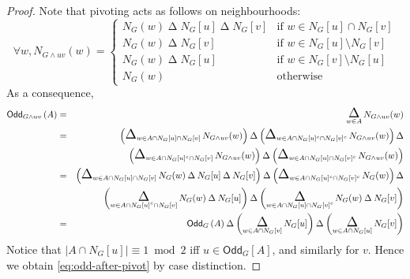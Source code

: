 \documentclass[a4paper,onecolumn,superscriptaddress,11pt,accepted=2020-04-27]{quantumarticle}
\newcommand{\symd}{\mathbin{\Delta}\xspace}
\newcommand{\Symdi}[1]{\underset{\scriptstyle #1}{\scalebox{1.5}{$\symd$}}\,}
\newcommand{\symdi}[1]{{\scalebox{1.5}{$\symd$}}_{#1}\,}
\newcommand{\odd}[2]{\textsf{Odd}_{#1}\left(#2\right)}
\newcommand{\codd}[2]{\textsf{Odd}_{#1}\left[#2\right]}
\theoremstyle{definition}
\begin{document}
\begin{proof}

Note that pivoting acts as follows on neighbourhoods: %
$$\forall w, N_{G\wedge uv} (w) = \begin{cases} 
N_G(w) \symd N_G[u]\symd N_G[v] &\text{if $w\in N_G[u]\cap N_G[v]$}\\
N_G(w) \symd N_G[v] &\text{if $w\in N_G[u]\setminus  N_G[v]$}\\
N_G(w) \symd N_G[u] &\text{if $w\in N_G[v]\setminus  N_G[u]$}\\
 N_G(w) &\text{otherwise} \end{cases}$$
As a consequence, %
\begin{eqnarray*}
  \odd {G\wedge uv} A&=&\Symdi{w\in A} N_{G\wedge uv} (w)\\
  &=& \left(\symdi{w\in A\cap N_G[u]\cap N_G[v]} N_{G\wedge uv} (w) \right) \symd
      \left(\symdi{w\in A\cap N_G[u]^c\cap N_G[v]^c} N_{G\wedge uv} (w) \right) \symd \\
&&    \left(\symdi{w\in A\cap N_G[u]^c\cap N_G[v]} N_{G\wedge uv} (w) \right) \symd
      \left(\symdi{w\in A\cap N_G[u]\cap N_G[v]^c} N_{G\wedge uv} (w) \right) \\
 &=& \left(\symdi{w\in A\cap N_G[u]\cap N_G[v]} N_{G} (w) \symd N_G[u]\symd N_G[v] \right) \symd
    \left(\symdi{w\in A\cap N_G[u]^c\cap N_G[v]^c} N_{G} (w) \right) \symd \\
&&    \left(\Symdi{w\in A\cap N_G[u]^c\cap N_G[v]} N_{G} (w)  \symd N_G[u] \right) \symd
      \left(\Symdi{w\in A\cap N_G[u]\cap N_G[v]^c} N_{G} (w)  \symd N_G[v] \right) \\
  &=& \odd {G} A \symd \left(\Symdi{w\in A\cap N_G[v]} N_G[u]\right) \symd
      \left(\Symdi{w\in A\cap N_G[u]} N_G[v] \right)
\end{eqnarray*}
Notice that $\lvert A\cap N_G[u]\rvert \equiv 1 \bmod 2$ iff $u\in \codd G A$, and similarly for $v$. Hence we obtain \eqref{eq:odd-after-pivot} by case distinction.%
\end{proof}
\end{document}
